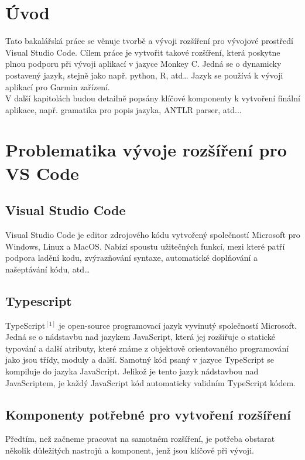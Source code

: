 \documentclass[czech,master,dept460,male,cpp,cpdeclaration]{diploma}
\begin{document}
\MakeTitlePages
\section{Úvod}
\label{sec:Introduction}
Tato bakalářská práce se věnuje tvorbě a vývoji rozšíření pro vývojové prostředí Visual Studio Code. Cílem práce je vytvořit takové rozšíření, která poskytne plnou podporu při vývoji aplikací v jazyce Monkey C. Jedná se o dynamicky postavený jazyk, stejně jako např. python, R, atd… Jazyk se používá k vývoji aplikací pro Garmin zařízení.\\ V další kapitolách budou detailně popsány klíčové komponenty k vytvoření finální aplikace, např. gramatika pro popis jazyka, ANTLR parser, atd... 



\section{Problematika vývoje rozšíření pro VS Code}
\subsection{Visual Studio Code}
Visual Studio Code je editor zdrojového kódu vytvořený společností Microsoft pro Windows, Linux a MacOS. Nabízí spoustu užitečných funkcí, mezi které patří podpora ladění kodu, zvýrazňování syntaxe, automatické doplňování a našeptávání kódu, atd…


\subsection{Typescript}
TypeScript$^{[1]}$ je open-source programovací jazyk vyvinutý společností Microsoft. Jedná se o nádstavbu nad jazykem JavaScript,
která jej rozšiřuje o statické typování a další atributy, které známe z objektově orientovaného programování jako jsou třídy, moduly a další. Samotný kód psaný v jazyce TypeScript se kompiluje
do jazyka JavaScript. Jelikož je tento jazyk nádstavbou nad JavaScriptem, je každý JavaScript kód automaticky validním TypeScript kódem.

\subsection{Komponenty potřebné pro vytvoření rozšíření}
Předtím, než začneme pracovat na samotném rozšíření, je potřeba obstarat několik důležitých nastrojů a komponent, jenž jsou klíčové při vývoji.
\end{document}
